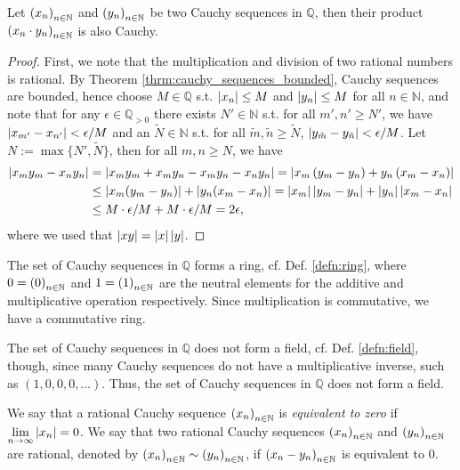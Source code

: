 \begin{theorem}\label{thrm:prod_Cauchy_sequences_Cauchy}
	Let $\seq[x_n]$ and $\seq[y_n]$ be two Cauchy sequences in $\mathbb Q$, then their product $\seq[x_n \cdot y_n]$ is also Cauchy.
\end{theorem}

\begin{proof}
	First, we note that the multiplication and division of two rational numbers is rational. By Theorem \ref{thrm:cauchy_sequences_bounded}, Cauchy sequences are bounded, hence choose $M\in\mathbb Q$ s.t. $\abs{x_n}\leq M$ and $\abs{y_n}\leq M$ for all $n\in\mathbb N$, and note that for any $\epsilon\in\mathbb Q_{>0}$ there exists $N'\in\mathbb N$ s.t. for all $m', n'\geq N'$, we have $\abs{x_{m'} - x_{n'}} < \epsilon/M$ and an $\tilde{N}\in\mathbb N$ s.t. for all $\tilde{m}, \tilde{n}\geq \tilde{N}$, $\abs{y_{\tilde{m}} - y_{\tilde{n}}} < \epsilon/M$. Let $N := \max\{N', \tilde{N}\}$, then for all $m, n\geq N$, we have
	\begin{align*}
		\abs{x_my_m - x_ny_n} &= \abs{x_my_m + x_my_n - x_my_n - x_ny_n} = \abs{x_m\left(y_m - y_n\right) + y_n\left(x_m - x_n\right)}
		\\ &\leq \abs{x_m(y_m - y_n)} + \abs{y_n(x_m - x_n)} = \abs{x_m}\abs{y_m - y_n} + \abs{y_n}\abs{x_m - x_n}
		\\ &\leq M\cdot \epsilon/M + M\cdot \epsilon/M = 2\epsilon,
	\end{align*}
	where we used that $\abs{xy} = \abs{x}\abs{y}$. 
\end{proof}

\begin{remark}
	The set of Cauchy sequences in $\mathbb Q$ forms a ring, cf. Def. \ref{defn:ring}, where $0 = \seq[0]$ and $1 = \seq[1]$ are the neutral elements for the additive and multiplicative operation respectively. Since multiplication is commutative, we have a commutative ring.
\end{remark}

\begin{remark}
	The set of Cauchy sequences in $\mathbb Q$ does not form a field, cf. Def. \ref{defn:field}, though, since many Cauchy sequences do not have a multiplicative inverse, such as $(1, 0, 0, 0, \dots)$. Thus, the set of Cauchy sequences in $\mathbb Q$ does not form a field.
\end{remark}

\begin{defn}
	We say that a rational Cauchy sequence $\seq[x_n]$ is \textit{equivalent to zero} if $\lim\limits_{n\to\infty} \abs{x_n} = 0$. We say that two rational Cauchy sequences $\seq[x_n]$ and $\seq[y_n]$ are rational, denoted by $\seq[x_n] \sim \seq[y_n]$, if $\seq[x_n - y_n]$ is equivalent to $0$.
\end{defn}

